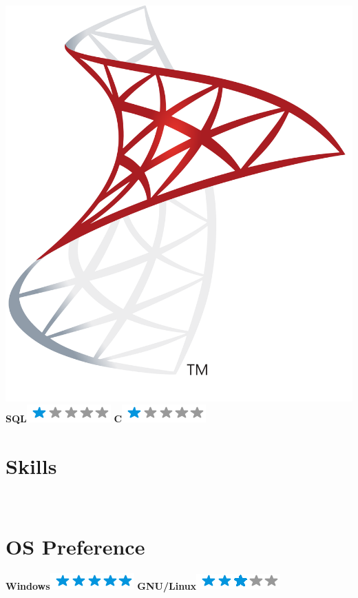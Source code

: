 \documentclass[a4paper]{friggeri-cv}
\begin{document}
\begin{aside}
     \includegraphics[scale=0.008]{img/SQL_logo.png} \textbf{SQL}\includegraphics[scale=0.40]{img/1stars.png}
     \textbf{C}\includegraphics[scale=0.40]{img/1stars.png}
    ~
  \section{Skills}
 ~
  \section{OS Preference}
    \textbf{Windows}\includegraphics[scale=0.40]{img/5stars.png}
    \textbf{GNU/Linux}\includegraphics[scale=0.40]{img/3stars.png}
    ~

\end{aside}
\end{document}
